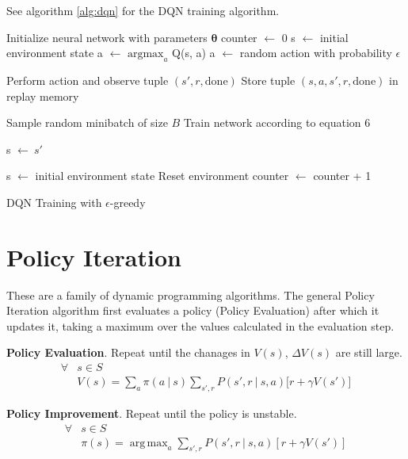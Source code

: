 \documentclass{article}
\newcommand{\giv}{\ |\ }
\DeclareMathOperator*{\argmax}{arg\,max}
\begin{document}
See algorithm \ref{alg:dqn} for the DQN training algorithm.

\begin{algorithm}[ht]
    \begin{algorithmic}
        \State Initialize neural network with parameters $\mathbf{\theta}$
        \State counter $\gets$ 0
        \State s $\gets$ initial environment state
        \Repeat
            \State a $\gets$ $\text{argmax}_a$ Q(s, a)
            \State a $\gets$ random action with probability $\epsilon$
            
            \State Perform action and observe tuple $(s', r, \text{done})$
            \State Store tuple $(s, a, s', r, \text{done})$ in replay memory 

                        \State Sample random minibatch of size $B$
                        \State Train network according to equation 6 
                    \EndIf
                \EndIf
            \EndIf
            
            \State s $\gets\ s'$

                \State s $\gets$ initial environment state
                \State Reset environment
            \EndIf
            \State counter $\gets$ counter + 1
    \end{algorithmic}
    \caption{DQN Training with $\epsilon$-greedy}
    \label{alg:dqn}
\end{algorithm}

\section{Policy Iteration}
These are a family of dynamic programming algorithms. The general Policy Iteration algorithm first evaluates a policy (Policy Evaluation) after which it updates it, taking a maximum over the values calculated in the evaluation step.

\textbf{Policy Evaluation}. Repeat until the chanages in $V(s)$, $\Delta V(s)$ are still large.
\begin{align*}
    \forall& s \in S \\
    & V(s) = \sum_a \pi(a \giv s) \sum_{s', r} P(s', r \giv s, a) \big[ r + \gamma V(s') \big]
\end{align*}

\textbf{Policy Improvement}. Repeat until the policy is unstable.
\begin{align*}
    \forall& s \in S \\
    & \pi(s) = \argmax_a \sum_{s', r} P(s', r \giv s, a) [r + \gamma V(s')]
\end{align*}
\end{document}
